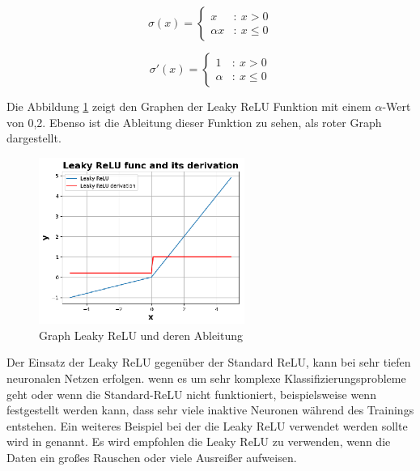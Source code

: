 \begin{equation}\label{eq:leaky_relu_function}
	\sigma (x) = \left\{
	\begin{array}{cl}
		x & : \ x > 0 \\
		\alpha x & : \ x \leq 0
	\end{array}
	\right.
\end{equation}

\begin{equation}\label{eq:derivative_leaky_relu_function}
	\sigma' (x) = \left\{
	\begin{array}{cl}
		1 & : \ x > 0 \\
		\alpha & : \ x \leq 0
	\end{array}
	\right.
\end{equation}

Die Abbildung \ref{img:leaky_relu_func_graph} zeigt den Graphen der Leaky ReLU Funktion mit einem $\alpha$-Wert von 0,2. Ebenso ist die Ableitung dieser Funktion zu sehen, als roter Graph dargestellt.

\begin{figure}[!ht]
	\includegraphics[width=0.6\textwidth]{content/chapter_basics/plots/leaky_relu_func_plot.eps}
	\centering
	\caption{Graph Leaky ReLU und deren Ableitung}
	\label{img:leaky_relu_func_graph}
\end{figure}

Der Einsatz der Leaky ReLU gegenüber der Standard ReLU, kann bei sehr tiefen neuronalen Netzen erfolgen. wenn es um sehr komplexe Klassifizierungsprobleme geht oder wenn die Standard-ReLU nicht funktioniert, beispielsweise wenn festgestellt werden kann, dass sehr viele inaktive Neuronen während des Trainings entstehen. Ein weiteres Beispiel bei der die Leaky ReLU verwendet werden sollte wird in \cite{rallabandi-2023} genannt. Es wird empfohlen die Leaky ReLU zu verwenden, wenn die Daten ein großes Rauschen oder viele Ausreißer aufweisen.\vspace{0.2cm}

